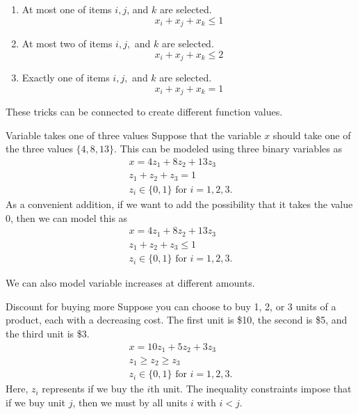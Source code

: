 \begin{enumerate}
\item At most one of items $i ,j$, and $k$ are selected.
 \begin{equation}
 x_i + x_j + x_k \leq 1
 \end{equation}
\item At most two of items $i,j,$ and $k$ are selected.
 \begin{equation}
 x_i + x_j + x_k \leq 2
 \end{equation}
\item Exactly one of items $i,j,$ and $k$ are selected.
 \begin{equation}
  x_i + x_j + x_k = 1
 \end{equation}
\end{enumerate}

These tricks can be connected to create different function values.  

\begin{example}{Variable takes one of three values}{}
Suppose that the variable $x$ should take one of the three values $\{4, 8, 13\}$. This can be modeled using three binary variables as
\begin{align*}
x=4z_1 +8z_2 +13z_3\\
 z_1 +z_2 +z_3 =1\\
z_i \in \{0, 1\} \text{ for } i = 1, 2,3.
\end{align*}
As a convenient addition, if we want to add the possibility that it takes the value $0$, then we can model this as 
\begin{align*}
x=4z_1 +8z_2 +13z_3\\
 z_1 +z_2 +z_3 \leq 1\\
z_i \in \{0, 1\} \text{ for } i = 1, 2,3.
\end{align*}
\end{example}


We can also model variable increases at different amounts.  \begin{example}{Discount for buying more}{}
Suppose you can choose to buy 1, 2, or 3 units of a product, each with a decreasing cost.  The first unit is \$10, the second is \$5, and the third unit is \$3.
\begin{align*}
x=10z_1 +5z_2 +3z_3\\
 z_1\geq z_2 \geq z_3\\
z_i \in \{0, 1\} \text{ for } i = 1, 2,3.
\end{align*}
Here, $z_i$ represents if we buy the $i$th unit.  The inequality constraints impose that if we buy unit $j$, then we must by all units $i$ with $i < j$.
\end{example}



